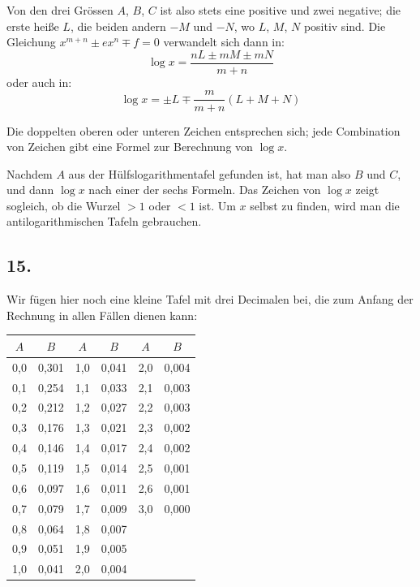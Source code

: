 \documentclass[12pt,a4paper]{article}
\newcommand{\1}{\ensuremath{\mathrlap{\,|\,}}} %
\begin{document}
Von den drei Grössen $A$, $B$, $C$ ist also stets eine positive und zwei negative; die erste heiße $L$, die beiden andern $-M$ und $-N$, wo $L$, $M$, $N$ positiv sind. Die Gleichung $x^{m+n} \pm ex^n \mp f = 0$ verwandelt sich dann in:
\[\log x = \frac{nL \pm mM \pm mN}{m+n}\]
oder auch in:
\[\log x = \pm L \mp \frac{m}{m+n}(L+M+N)\]

Die doppelten oberen oder unteren Zeichen entsprechen sich; jede Combination von Zeichen gibt eine Formel zur Berechnung von $\log x$.

Nachdem $A$ aus der Hülfslogarithmentafel gefunden ist, hat man also $B$ und $C$, und dann $\log x$ nach einer der sechs Formeln. Das Zeichen von $\log x$ zeigt sogleich, ob die Wurzel $> 1$ oder $< 1$ ist. Um $x$ selbst zu finden, wird man die antilogarithmischen Tafeln gebrauchen.

\subsection*{15.}

Wir fügen hier noch eine kleine Tafel mit drei Decimalen bei, die zum Anfang der Rechnung in allen Fällen dienen kann:

\begin{center}
\begin{tabular}{cc|cc|cc}
\toprule
$A$ & $B$ & $A$ & $B$ & $A$ & $B$ \\
\midrule
0,0 & 0,301 & 1,0 & 0,041 & 2,0 & 0,004 \\
0,1 & 0,254 & 1,1 & 0,033 & 2,1 & 0,003 \\
0,2 & 0,212 & 1,2 & 0,027 & 2,2 & 0,003 \\
0,3 & 0,176 & 1,3 & 0,021 & 2,3 & 0,002 \\
0,4 & 0,146 & 1,4 & 0,017 & 2,4 & 0,002 \\
0,5 & 0,119 & 1,5 & 0,014 & 2,5 & 0,001 \\
0,6 & 0,097 & 1,6 & 0,011 & 2,6 & 0,001 \\
0,7 & 0,079 & 1,7 & 0,009 & 3,0 & 0,000 \\
0,8 & 0,064 & 1,8 & 0,007 &  &  \\
0,9 & 0,051 & 1,9 & 0,005 &  &  \\
1,0 & 0,041 & 2,0 & 0,004 &  &  \\
\bottomrule
\end{tabular}
\end{center}
\end{document}

